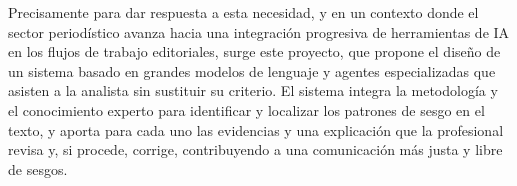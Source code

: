 Precisamente para dar respuesta a esta necesidad, y en un contexto donde el sector periodístico avanza hacia una integración progresiva de herramientas de IA en los flujos de trabajo editoriales, surge este proyecto, que propone el diseño de un sistema basado en grandes modelos de lenguaje y agentes especializadas que asisten a la analista sin sustituir su criterio. El sistema integra la metodología y el conocimiento experto para identificar y localizar los patrones de sesgo en el texto, y aporta para cada uno las evidencias y una explicación que la profesional revisa y, si procede, corrige, contribuyendo a una comunicación más justa y libre de sesgos.